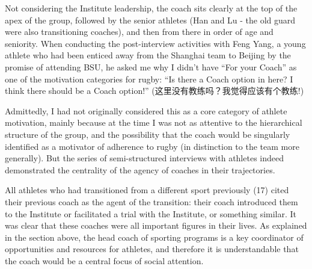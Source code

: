 \begin{CJK}{UTF8}{gbsn}
Not considering the Institute leadership, the coach sits clearly at the top of the apex of the group, followed by the senior athletes (Han and Lu - the old guard were also transitioning coaches), and then from there in order of age and seniority.  When conducting the post-interview activities with Feng Yang, a young athlete who had been enticed away from the Shanghai team to Beijing by the promise of attending BSU, he asked me why I didn't have ``For your Coach'' as one of the motivation categories for rugby:  ``Is there a Coach option in here?  I think there should be a Coach option!'' (这里没有教练吗？我觉得应该有个教练!)

Admittedly, I had not originally considered this as a core category of athlete motivation, mainly because at the time I was not as attentive to the hierarchical structure of the group, and the possibility that the coach would be singularly identified as a motivator of adherence to rugby (in distinction to the team more generally).  But the series of semi-structured interviews with athletes indeed demonstrated the centrality of the agency of coaches in their trajectories.

All athletes who had transitioned from a different sport previously (17) cited their previous coach as the agent of the transition: their coach introduced them to the Institute or facilitated a trial with the Institute, or something similar.  It was clear that these coaches were all important figures in their lives. As explained in the section above, the head coach of sporting programs is a key coordinator of opportunities and resources for athletes, and therefore it is understandable that the coach would be a central focus of social attention.


\end{CJK}
